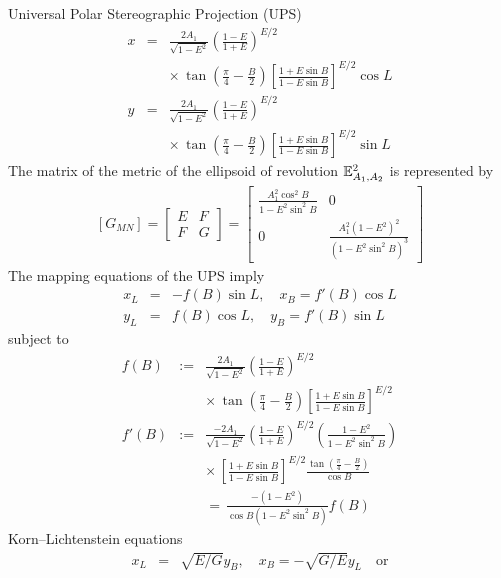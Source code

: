 \documentclass[jog]{svjour}
\begin{document}
\begin{example}\label{ex:2}
Universal Polar Stereographic Projection (UPS)
\begin{eqnarray*}
x &= &\frac{2A_1}{\sqrt{1-E^2}}\left(\frac{1-E}{1+E}\right)^{E/2} \\
& &\times\,\tan\left(\frac{\pi}{4}-\frac{B}{2}\right)\left[\frac{1+E\sin B}{1-E\sin B}\right]^{E/2}\cos L\\
y &= &\frac{2A_1}{\sqrt{1-E^2}}\left(\frac{1-E}{1+E}\right)^{E/2} \\
& &\times\,\tan\left(\frac{\pi}{4}-\frac{B}{2}\right)\left[\frac{1+E\sin B}{1-E\sin B}\right]^{E/2}\sin L
\end{eqnarray*}
The matrix of the metric of the ellipsoid of revolution
$\Bbb{E}^2_{A_1,A_2}$ is represented by
\begin{eqnarray*}
\left[G_{MN}\right] \!=\!
 \left[\begin{array}{cc}
 E&F\\
 F&G\end{array}\right]
 \!=\! \left[\begin{array}{cc}
 {\displaystyle\frac{A^2_1\cos^2B}{1-E^2\sin^2 B}}&0\\
 0&{\displaystyle\frac{A^2_1(1-E^2)^2}{(1-E^2\sin^2 B)^3}}
\end{array}\right]
\end{eqnarray*}
The mapping equations of the UPS imply
\begin{eqnarray*}
x_L &= &-f(B)\sin L, \quad x_B = f'(B) \cos L \\
y_L &= &f(B) \cos L, \quad y_B=f'(B)\sin L
\end{eqnarray*}
subject to
\begin{eqnarray*}
f(B) &:= &\frac{2A_1}{\sqrt{1-E^2}}\left(\frac{1-E}{1+E}\right)^{E/2} \\
& &\times\,\tan\left(\frac{\pi}{4}-\frac{B}{2}\right)\left[\frac{1+E\sin B}{1-E\sin B}\right]^{E/2}\\
f'(B) &:= &\frac{-2A_1}{\sqrt{1-E^2}}\left(\frac{1-E}{1+E}\right)^{E/2}\left(\frac{1-E^2}{1-E^2\sin^2B}\right) \\
& &\times\,\left[\frac{1+E\sin B}{1-E\sin B}\right]^{E/2}\frac{\tan\left(\displaystyle{\frac{\pi}{4}-\frac{B}{2}}\right)}{\cos B} \\
& &=\,\frac{-(1-E^2)}{\cos B(1-E^2\sin^2B)}f(B)
\end{eqnarray*}
Korn--Lichtenstein equations
\begin{eqnarray*}
x_L &= &\sqrt{E/G}y_B, \quad x_B=-\sqrt{G/E}y_L \quad \mathrm{or} \\

\end{eqnarray*}
\end{example}
\end{document}
